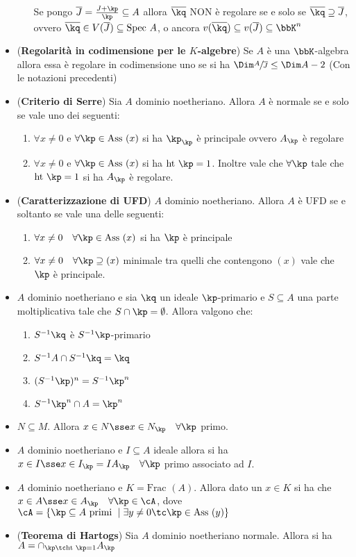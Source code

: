 \documentclass[a4paper,NoNotes,GeneralMath]{stdmdoc}
\newcommand{\Ass}{\text{Ass }}
\newcommand{\Ht}{\text{ht }}
\newcommand{\Frac}{\text{Frac }}
\newcommand{\Spec}{\text{Spec }}
\newcommand{\ov}{\overline}
\begin{document}
\begin{itemize}
\begin{enumerate}
    Se pongo $\ov{J} = \frac{J + \kp}{\kp} \subseteq A$ allora $\ov\kq$
    NON è regolare se e solo se $\ov\kq \supseteq \ov{J}$, ovvero
    $\ov\kq \in V(\ov{J}) \subseteq \Spec A$, o ancora $v(\ov{\kq})
    \subseteq v(\ov{J}) \subseteq \bbK^n$
  \end{enumerate}
\item ({\bf Regolarità in codimensione per le $K$-algebre}) Se $A$ è una
  $\bbK$-algebra allora essa è regolare in codimensione uno se si ha
  $\Dim \sfrac{A}{\ov{J}} \le \Dim A - 2$ (Con le notazioni precedenti)
\item ({\bf Criterio di Serre}) Sia $A$ dominio noetheriano. Allora $A$
  è normale se e solo se vale uno dei seguenti:
  \begin{enumerate}
  \item $\forall x \neq 0$ e $\forall \kp \in \Ass (x)$ si ha $\kp_\kp$
    è principale ovvero $A_\kp$ è regolare
  \item $\forall x \neq 0$ e $\forall \kp \in \Ass(x)$ si ha
    $\Ht \kp = 1$. Inoltre vale che $\forall \kp$ tale che $\Ht \kp = 1$
    si ha $A_\kp$ è regolare.
  \end{enumerate}
\item ({\bf Caratterizzazione di UFD}) $A$ dominio noetheriano. Allora
  $A$ è UFD se e soltanto se vale una delle seguenti:
  \begin{enumerate}
  \item $\forall x \neq 0 \quad \forall \kp \in \Ass (x)$ si ha $\kp$ è
    principale
  \item $\forall x \neq 0 \quad \forall \kp \supseteq (x)$ minimale tra
    quelli che contengono $(x)$ vale che $\kp$ è principale.
  \end{enumerate}
\item $A$ dominio noetheriano e sia $\kq$ un ideale $\kp$-primario e $S
  \subseteq A$ una parte moltiplicativa tale che $S \cap \kp =
  \emptyset$. Allora valgono che:
  \begin{enumerate}
  \item $S^{-1}\kq$ è $S^{-1}\kp$-primario
  \item $S^{-1}A \cap S^{-1}\kq = \kq$
  \item $(S^{-1}\kp)^n = S^{-1} \kp^n$
  \item $S^{-1} \kp^n \cap A = \kp^n$
  \end{enumerate}
\item $N \subseteq M$. Allora $x \in N \sse x \in N_\kp \quad \forall
  \kp$ primo.
\item $A$ dominio noetheriano e $I \subseteq A$ ideale allora si ha
  $x \in I \sse x \in I_\kp = I A_\kp \quad \forall \kp$ primo associato
  ad $I$.
\item $A$ dominio noetheriano e $K = \Frac(A)$. Allora dato un $x \in K$
  si ha che $x \in A \sse x \in A_\kp \quad \forall \kp \in \cA$, dove
  $\cA = \{ \kp \subseteq A \text{ primi } \mid \exists y \neq 0 \tc \kp
  \in \Ass (y) \}$
\item ({\bf Teorema di Hartogs}) Sia $A$ dominio noetheriano
  normale. Allora si ha $A = \cap_{\kp \tc \Ht \kp = 1} A_\kp$
\end{itemize}
\end{document}
